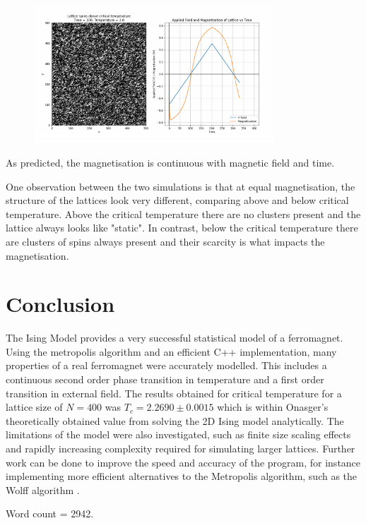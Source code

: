 \documentclass[a4paper, 12pt]{article}
\begin{document}
\begin{figure}[H]
	\centering
	\includegraphics[width=0.8\textwidth]{./resources/frames/hysteresis_above_tc_3.png}
\end{figure}

As predicted, the magnetisation is continuous with magnetic field and time. 

One observation between the two simulations is that at equal magnetisation, the structure of the lattices look very different, comparing above and below critical temperature. Above the critical temperature there are no clusters present and the lattice always looks like "static". In contrast, below the critical temperature there are clusters of spins always present and their scarcity is what impacts the magnetisation.

\section{Conclusion}
The Ising Model provides a very successful statistical model of a ferromagnet. Using the metropolis algorithm and an efficient C++ implementation, many properties of a real ferromagnet were accurately modelled. This includes a continuous second order phase transition in temperature and a first order transition in external field. The results obtained for critical temperature for a lattice size of \(N=400\) was \( T_c = 2.2690 \pm 0.0015 \) which is within Onasger's theoretically obtained value from solving the 2D Ising model analytically. The limitations of the model were also investigated, such as finite size scaling effects and rapidly increasing complexity required for simulating larger lattices. Further work can be done to improve the speed and accuracy of the program, for instance implementing more efficient alternatives to the Metropolis algorithm, such as the Wolff algorithm \cite{7}.

Word count = 2942.
\end{document}

